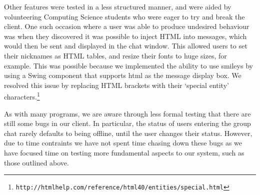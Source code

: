 Other features were tested in a less structured manner, and were aided by volunteering Computing Science students who were eager to try and break the client. One such occasion where a user was able to produce undesired behaviour was when they discovered it was possible to inject HTML into messages, which would then be sent and displayed in the chat window. This allowed users to set their nicknames as HTML tables, and resize their fonts to huge sizes, for example. This was possible because we implemented the ability to use smileys by using a Swing component that supports html as the message display box. We resolved this issue by replacing HTML brackets with their `special entity' characters.\footnote{\texttt{http://htmlhelp.com/reference/html40/entities/special.html}}

As with many programs, we are aware through less formal testing that there are still some bugs in our client. In particular, the status of users entering the group chat rarely defaults to being offline, until the user changes their status. However, due to time contraints we have not spent time chasing down these bugs as we have focused time on testing more fundamental aspects to our system, such as those outlined above. 


